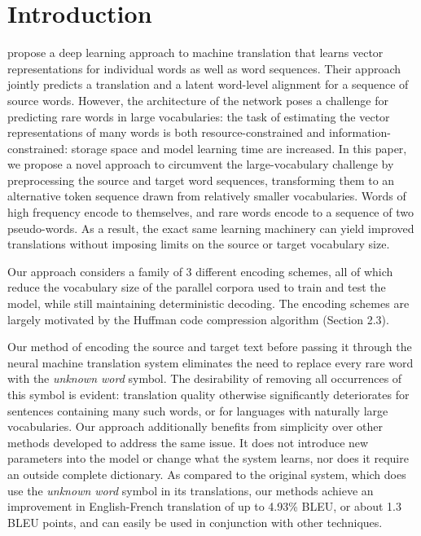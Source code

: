 \section{Introduction}
\label{sec:intro}

 propose a deep learning approach to
machine translation that learns vector representations for individual words as
well as word sequences. Their approach jointly predicts a translation and a
latent word-level alignment for a sequence of source words. However, the architecture of
the network poses a challenge for predicting rare words in large
vocabularies: the task of estimating the vector representations of many words
is both resource-constrained and information-constrained: storage space and model learning time
are increased. In this paper, we
propose a novel approach to circumvent the large-vocabulary challenge by preprocessing the source
and target word sequences, transforming them to an alternative token sequence drawn from
relatively smaller vocabularies. Words of high frequency encode to themselves, and rare
words encode to a sequence of two pseudo-words. As a result, the exact same learning machinery
can yield improved translations without imposing limits on the source or target
vocabulary size.

Our approach considers a family of 3 different encoding schemes, all of which
reduce the vocabulary size of the parallel corpora used to train and test the model,
while still maintaining deterministic decoding. The encoding schemes are largely
motivated by the Huffman code compression algorithm (Section 2.3).

Our method of encoding the source and target text before passing it through the
neural machine translation system eliminates the need to replace every rare word with the
\emph{unknown word} symbol. The desirability of removing all occurrences of this symbol is evident: translation
quality otherwise significantly deteriorates for sentences containing many such words, or for
languages with naturally large vocabularies. Our approach additionally benefits from simplicity over
other methods developed to address the same issue. It does not introduce
new parameters into the model or change what the system learns, nor does it require an outside complete dictionary.
 As compared to the original system, which does use the \emph{unknown word} symbol in
its translations, our methods achieve an improvement in English-French translation of up to 4.93\% BLEU, or about 1.3 BLEU points,
and can easily be used in conjunction with other techniques.